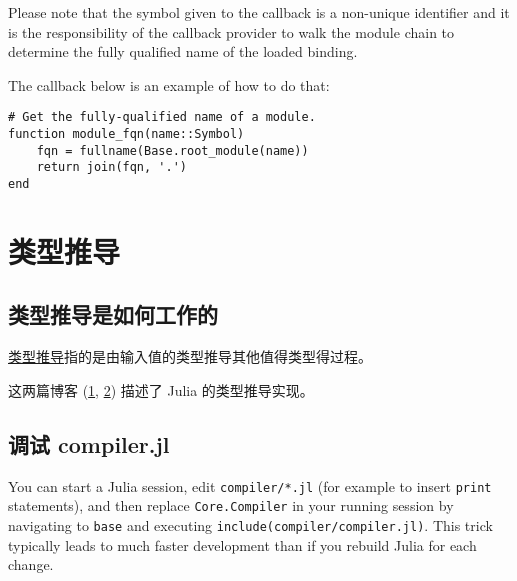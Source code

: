 Please note that the symbol given to the callback is a non-unique identifier and it is the responsibility of the callback provider to walk the module chain to determine the fully qualified name of the loaded binding.



The callback below is an example of how to do that:




\begin{verbatim}
# Get the fully-qualified name of a module.
function module_fqn(name::Symbol)
    fqn = fullname(Base.root_module(name))
    return join(fqn, '.')
end
\end{verbatim}



\hypertarget{17787937227289045576}{}


\section{类型推导}



\hypertarget{2654942546276234129}{}


\subsection{类型推导是如何工作的}



\href{https://en.wikipedia.org/wiki/Type\_inference}{类型推导}指的是由输入值的类型推导其他值得类型得过程。



这两篇博客 (\href{https://juliacomputing.com/blog/2016/04/04/inference-convergence.html}{1}, \href{https://juliacomputing.com/blog/2017/05/15/inference-converage2.html}{2}) 描述了 Julia 的类型推导实现。



\hypertarget{4685549306288927755}{}


\subsection{调试 compiler.jl}



You can start a Julia session, edit \texttt{compiler/*.jl} (for example to insert \texttt{print} statements), and then replace \texttt{Core.Compiler} in your running session by navigating to \texttt{base} and executing \texttt{include({\textquotedbl}compiler/compiler.jl{\textquotedbl})}. This trick typically leads to much faster development than if you rebuild Julia for each change.



